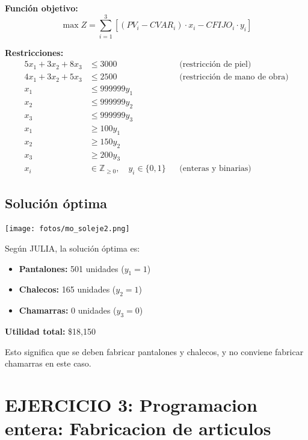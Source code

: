 \documentclass[12pt, a4paper, oneside]{book}
\theoremstyle{definition}
\begin{document}
    \textbf{Función objetivo:}
    \[
    \max Z = \sum_{i=1}^{3} \left[ (PV_i - CVAR_i)\cdot x_i - CFIJO_i \cdot y_i \right]
    \]

    \textbf{Restricciones:}
    \begin{align*}
    5x_1 + 3x_2 + 8x_3 &\leq 3000 && \text{(restricción de piel)} \\
    4x_1 + 3x_2 + 5x_3 &\leq 2500 && \text{(restricción de mano de obra)} \\
    x_1 &\leq 999999 y_1 \\
    x_2 &\leq 999999 y_2 \\
    x_3 &\leq 999999 y_3 \\
    x_1 &\geq 100 y_1 \\
    x_2 &\geq 150 y_2 \\
    x_3 &\geq 200 y_3 \\
    x_i &\in \mathbb{Z}_{\geq 0},\quad y_i \in \{0,1\} && \text{(enteras y binarias)}
    \end{align*}

    \subsection{Solución óptima}

    \begin{center}
    \texttt{[image: fotos/mo\_soleje2.png]}
    \end{center}

    Según JULIA, la solución óptima es:

    \begin{itemize}
        \item \textbf{Pantalones:} 501 unidades ($y_1 = 1$)
        \item \textbf{Chalecos:} 165 unidades ($y_2 = 1$)
        \item \textbf{Chamarras:} 0 unidades ($y_3 = 0$)
    \end{itemize}

    \textbf{Utilidad total:} \$18,150

    Esto significa que se deben fabricar pantalones y chalecos, y no conviene fabricar chamarras en este caso.


    \newpage

    \section{EJERCICIO 3: Programacion entera: Fabricacion de articulos}
\end{document}
